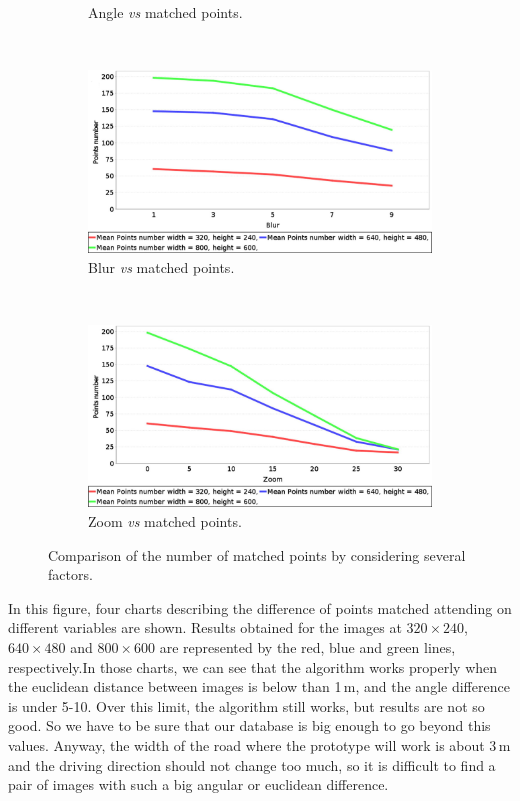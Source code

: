 \begin{figure}[h!]
\begin{subfigure}[b]{0.45\textwidth}
	  \caption{Angle \emph{vs} matched points.}\label{fig:cp01_angle_vs_matched}
        \end{subfigure}%
        \\
        \begin{subfigure}[b]{0.45\textwidth}
	    \includegraphics[width=\textwidth]{blurVsMatches}
	  \caption{Blur \emph{vs} matched points.}\label{fig:cp01_blur_vs_matched}
        \end{subfigure}%
        ~
        \begin{subfigure}[b]{0.45\textwidth}
	    \includegraphics[width=\textwidth]{zoomVsMatches}
	  \caption{Zoom \emph{vs} matched points.}\label{fig:cp01_zoom_vs_matched}
        \end{subfigure}%
        \caption{Comparison of the number of matched points by considering several factors.}\label{fig:cp01_matching_results}
\end{figure}

In this figure, four charts describing the difference of points matched attending on different variables are shown. Results obtained for the images at $320 \times 240$, $640 \times 480$ and $800 \times 600$ are represented by the red, blue and green lines, respectively.In those charts, we can see that the algorithm works properly when the euclidean distance between images is below than 1\,m, and the angle difference is under 5-10\textdegree. Over this limit, the algorithm still works, but results are not so good. So we have to be sure that our database is big enough to go beyond this values. Anyway, the width of the road where the prototype will work is about 3\,m and the driving direction should not change too much, so it is difficult to find a pair of images with such a big angular or euclidean difference.

